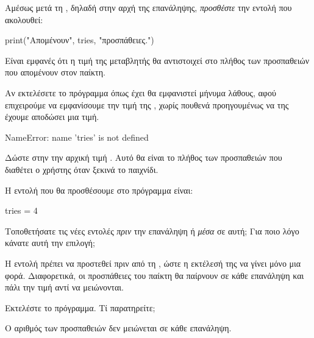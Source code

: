 \documentclass[a4paper,11pt,oneside]{book}
\begin{document}
\begin{step}
\label{step:tries-print}
Αμέσως μετά τη , δηλαδή στην αρχή της επανάληψης, \emph{προσθέστε} την εντολή που ακολουθεί:

\begin{pynew}
print("Απομένουν", tries, "προσπάθειες.")
\end{pynew}

Είναι εμφανές ότι η τιμή της μεταβλητής  θα αντιστοιχεί στο πλήθος των προσπαθειών που απομένουν στον παίκτη. 

\marginnote[16pt]{\iconcaution}
Αν εκτελέσετε το πρόγραμμα όπως έχει θα εμφανιστεί μήνυμα λάθους, αφού επιχειρούμε να εμφανίσουμε την τιμή της , χωρίς πουθενά προηγουμένως να της έχουμε αποδώσει μια τιμή.

\marginnote[16pt]{\iconcomputer}
\begin{pyterm}
NameError: name 'tries' is not defined
\end{pyterm}
\end{step}

\begin{step}
\label{step:tries-init}
Δώστε στην  την αρχική τιμή . Αυτό θα είναι το πλήθος των προσπαθειών που διαθέτει ο χρήστης όταν ξεκινά το παιχνίδι. %

\begin{answer}
Η εντολή που θα προσθέσουμε στο πρόγραμμα είναι:
	
\begin{pynew}
tries = 4
\end{pynew}
\end{answer}

Τοποθετήσατε τις νέες εντολές \emph{πριν} την επανάληψη ή \emph{μέσα} σε αυτή; Για ποιο λόγο κάνατε αυτή την επιλογή;

\begin{answer}
Η εντολή πρέπει να προστεθεί πριν από τη , ώστε η εκτέλεσή της να γίνει μόνο μια φορά. Διαφορετικά, οι προσπάθειες του παίκτη θα παίρνουν σε κάθε επανάληψη και πάλι την τιμή  αντί να μειώνονται.
\end{answer}

Εκτελέστε το πρόγραμμα. Τί παρατηρείτε;

\begin{answer}
Ο αριθμός των προσπαθειών δεν μειώνεται σε κάθε επανάληψη.
\end{answer}
\end{step}
\end{document}
